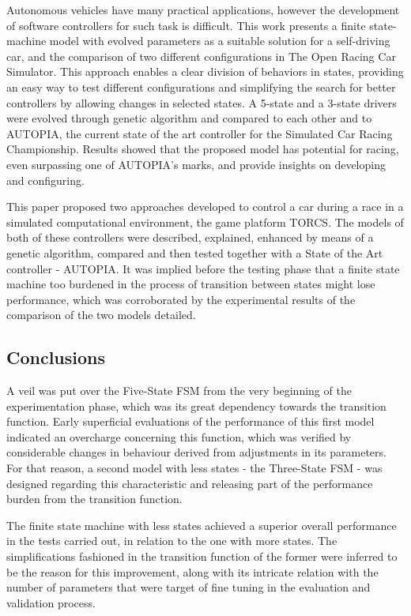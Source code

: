 Autonomous vehicles have many practical applications, however the development of software controllers for such task is difficult. This work presents a finite state-machine model with evolved parameters as a suitable solution for a self-driving car, and the comparison of two different configurations in The Open Racing Car Simulator. This approach enables a clear division of behaviors in states, providing an easy way to test different configurations and simplifying the search for better controllers by allowing changes in selected states. A 5-state and a 3-state drivers were evolved through genetic algorithm and compared to each other and to AUTOPIA, the current state of the art controller for the Simulated Car Racing Championship. Results showed that the proposed model has potential for racing, even surpassing one of AUTOPIA's marks, and provide insights on developing and configuring.

	This paper proposed two approaches developed to control a car during a race in a simulated computational environment, the game platform TORCS. The models of both of these controllers were described, explained, enhanced by means of a genetic algorithm, compared and then tested together with a State of the Art controller - AUTOPIA. It was implied before the testing phase that a finite state machine too burdened in the process of transition between states might lose performance, which was corroborated by the experimental results of the comparison of the two models detailed.

\subsection{Conclusions} \label{subsec:Conclusions}

	A veil was put over the Five-State FSM from the very beginning of the experimentation phase, which was its great dependency towards the transition function. Early superficial evaluations of the performance of this first model indicated an overcharge concerning this function, which was verified by considerable changes in behaviour derived from adjustments in its parameters. For that reason, a second model with less states - the Three-State FSM - was designed regarding this characteristic and releasing part of the performance burden from the transition function.

	The finite state machine with less states achieved a superior overall performance in the tests carried out, in relation to the one with more states. The simplifications fashioned in the transition function of the former were inferred to be the reason for this improvement, along with its intricate relation with the number of parameters that were target of fine tuning in the evaluation and validation process.

